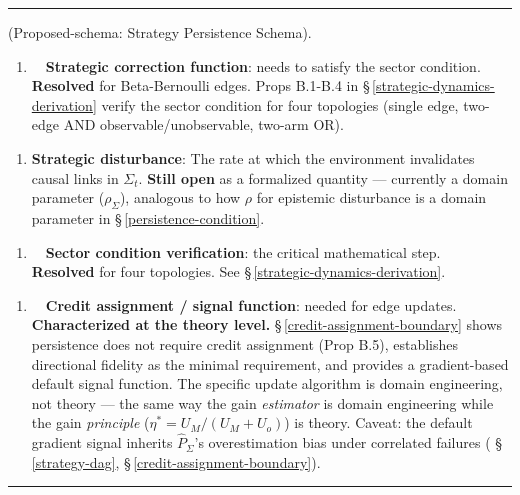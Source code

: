 \documentclass[11pt,oneside]{article}
\newcounter{claim}[section]
\renewcommand{\theclaim}{\thesection.\arabic{claim}}
\newenvironment{segment}[2]{%
  \refstepcounter{claim}%
  \bigskip\noindent\hrule\smallskip
  \noindent{\bfseries #1~\theclaim}\enskip(#2).\par\smallskip
  \noindent\ignorespaces
}{%
  \par\smallskip\noindent\hrule\bigskip
}
\newenvironment{remark}[1][]{\begin{segment}{Remark}{#1}}{\end{segment}}
\begin{document}
\begin{remark}[Proposed-schema: Strategy Persistence Schema]
\begin{enumerate}
  \item ~~\textbf{Strategic correction function}: needs to satisfy the sector condition.~~ \textbf{Resolved} for Beta-Bernoulli edges. Props B.1-B.4 in \S\,\ref{strategic-dynamics-derivation} verify the sector condition for four topologies (single edge, two-edge AND observable/unobservable, two-arm OR).
\end{enumerate}


\begin{enumerate}
  \item \textbf{Strategic disturbance}: The rate at which the environment invalidates causal links in $\Sigma_t$. \textbf{Still open} as a formalized quantity — currently a domain parameter ($\rho_\Sigma$), analogous to how $\rho$ for epistemic disturbance is a domain parameter in \S\,\ref{persistence-condition}.
\end{enumerate}


\begin{enumerate}
  \item ~~\textbf{Sector condition verification}: the critical mathematical step.~~ \textbf{Resolved} for four topologies. See \S\,\ref{strategic-dynamics-derivation}.
\end{enumerate}


\begin{enumerate}
  \item ~~\textbf{Credit assignment / signal function}: needed for edge updates.~~ \textbf{Characterized at the theory level.} \S\,\ref{credit-assignment-boundary} shows persistence does not require credit assignment (Prop B.5), establishes directional fidelity as the minimal requirement, and provides a gradient-based default signal function. The specific update algorithm is domain engineering, not theory — the same way the gain \textit{estimator} is domain engineering while the gain \textit{principle} ($\eta^* = U_M/(U_M + U_o)$) is theory. Caveat: the default gradient signal inherits $\hat P_\Sigma$'s overestimation bias under correlated failures ( \S\,\ref{strategy-dag}, \S\,\ref{credit-assignment-boundary}).
\end{enumerate}



\end{remark}
\end{document}
